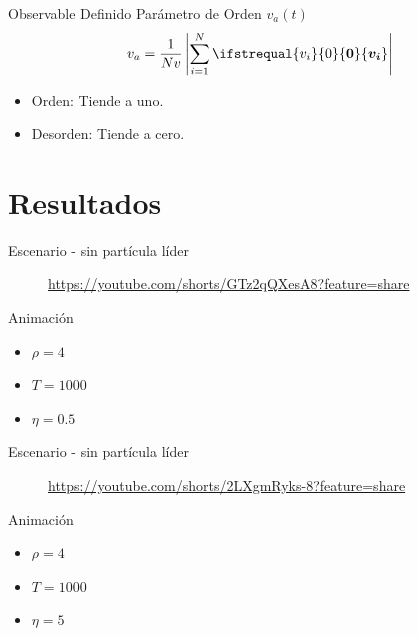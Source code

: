 \documentclass{beamer}
\renewcommand\vec[1]{\ifstrequal{#1}{0}{\ensuremath{\mathbf{0}}}{\ensuremath{\boldsymbol{#1}}}}
\begin{document}
\begin{frame}{Observable Definido}
    Parámetro de Orden $v_a(t)$
    \begin{equation*}
        v_a = \frac{1}{Nv} \left|\sum_{i=1}^{N} \vec{v_i} \right|
    \end{equation*}
    \begin{itemize}
        \item Orden: Tiende a uno.
        \item Desorden: Tiende a cero.
    \end{itemize}
\end{frame}

\section{Resultados}
\begin{frame}{Escenario - sin partícula líder}
    \begin{minipage}[t]{0.60\textwidth}
        \begin{figure}[H!]
            \caption*{\url{https://youtube.com/shorts/GTz2qQXesA8?feature=share}}
        \end{figure}
    \end{minipage}
    \hfill
    \begin{minipage}[t]{0.30\textwidth}
        \begin{block}{Animación}
            \begin{itemize}
                \item $\rho=4$
                \item $T=1000$
                \item $\eta=0.5$
            \end{itemize}
        \end{block}
    \end{minipage}
\end{frame}

\begin{frame}{Escenario - sin partícula líder}
    \begin{minipage}[t]{0.60\textwidth}
        \begin{figure}[H!]
            \caption*{\url{https://youtube.com/shorts/2LXgmRyks-8?feature=share}}
        \end{figure}
    \end{minipage}
    \hfill
    \begin{minipage}[t]{0.35\textwidth}
        \begin{block}{Animación}
            \begin{itemize}
                \item $\rho=4$
                \item $T=1000$
                \item $\eta=5$
            \end{itemize}
        \end{block}
    \end{minipage}
\end{frame}
\end{document}

